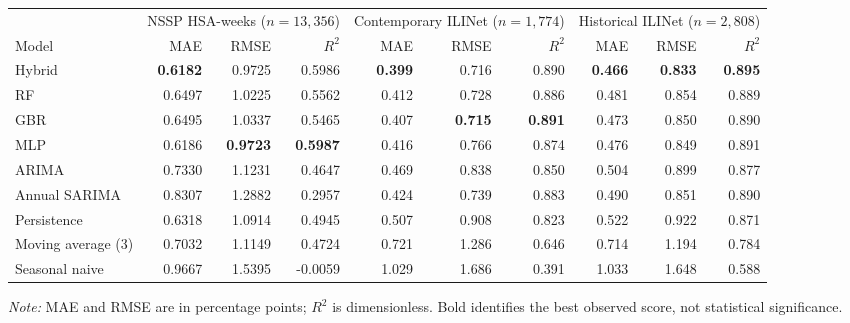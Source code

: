 \par\noindent\begin{minipage}{\textwidth}
\label{tab:results}\centering\footnotesize
\begin{tabular}{@{}lrrrrrrrrr@{}}
\toprule
&\multicolumn{3}{c}{NSSP HSA-weeks ($n=13,356$)}&\multicolumn{3}{c}{Contemporary ILINet ($n=1,774$)}&\multicolumn{3}{c}{Historical ILINet ($n=2,808$)}\\
\cmidrule(lr){2-4}\cmidrule(lr){5-7}\cmidrule(l){8-10}
Model & MAE & RMSE & $R^2$ & MAE & RMSE & $R^2$ & MAE & RMSE & $R^2$\\
\midrule
Hybrid &\textbf{0.6182}&0.9725&0.5986&\textbf{0.399}&0.716&0.890&\textbf{0.466}&\textbf{0.833}&\textbf{0.895}\\
RF &0.6497&1.0225&0.5562&0.412&0.728&0.886&0.481&0.854&0.889\\
GBR &0.6495&1.0337&0.5465&0.407&\textbf{0.715}&\textbf{0.891}&0.473&0.850&0.890\\
MLP &0.6186&\textbf{0.9723}&\textbf{0.5987}&0.416&0.766&0.874&0.476&0.849&0.891\\
ARIMA &0.7330&1.1231&0.4647&0.469&0.838&0.850&0.504&0.899&0.877\\
Annual SARIMA &0.8307&1.2882&0.2957&0.424&0.739&0.883&0.490&0.851&0.890\\
Persistence &0.6318&1.0914&0.4945&0.507&0.908&0.823&0.522&0.922&0.871\\
Moving average (3) &0.7032&1.1149&0.4724&0.721&1.286&0.646&0.714&1.194&0.784\\
Seasonal naive &0.9667&1.5395&-0.0059&1.029&1.686&0.391&1.033&1.648&0.588\\
\bottomrule
\end{tabular}
\par\smallskip\raggedright\footnotesize
\textit{Note:} MAE and RMSE are in percentage points; $R^2$ is dimensionless. Bold identifies the best observed score, not statistical significance.
\end{minipage}
\par\smallskip
